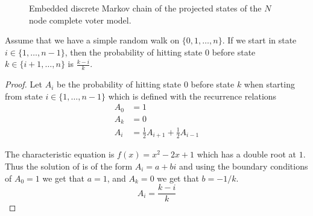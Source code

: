 \begin{figure}[H]
  \centering
{}
\caption{Embedded discrete Markov chain of the projected states of the $N$ node complete voter model.}
  \label{fig:rw_voter_model_discrete}
\end{figure}

\begin{lemma}\label{lem:rw_hit_zero}
Assume that we have a simple random walk on $\{0,1,\ldots, n\}$.
If we start in state $i \in \{1,\ldots, n - 1\}$, then the probability of hitting state 0 before state $k \in \{i + 1, \ldots, n\}$ is $\frac{k - i}{k}$.
\end{lemma}

\begin{proof}
Let $A_i$ be the probability of hitting state 0 before state $k$ when starting from state $i \in \{1,\ldots, n - 1\}$ which is defined with the recurrence relations
\begin{align*}
    A_0 &= 1\\
    A_{k} &= 0\\
    A_i &= \frac{1}{2} A_{i + 1} + \frac{1}{2} A_{i - 1}
\end{align*}

The characteristic equation is $f(x) = x^2 - 2x + 1$ which has a double root at $1$.
Thus the solution of is of the form $A_i = a + bi$ and using the boundary conditions of $A_0 = 1$ we get that $a = 1$, and $A_{k} = 0$ we get that $b = - 1/k$.
$$
A_i = \frac{k - i}{k}
$$
\end{proof}

